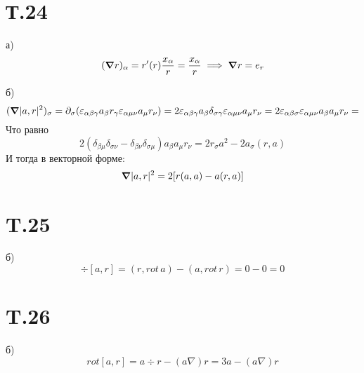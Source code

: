 \documentclass[12pt]{article}
\begin{document}
\section{Т.24}
а) 
\[
    (\grad r)_\alpha = r^{\prime}(r) \frac{x_\alpha}{r} = \frac{x_\alpha}{r} \implies 
    \grad r = e_r
\]

б) 
\[
    (\grad \vert a, r \vert^2)_\sigma = 
    \partial_\sigma (\varepsilon_{\alpha \beta \gamma} a_\beta r_\gamma \varepsilon_{\alpha \mu \nu} a_\mu r_\nu) = 
    2\varepsilon_{\alpha \beta \gamma} a_\beta \delta_{\sigma \gamma} \varepsilon_{\alpha \mu \nu} a_\mu r_\nu = 
    2 \varepsilon_{\alpha \beta \sigma} \varepsilon_{\alpha \mu \nu} a_\beta a_\mu r_\nu = 
\]
Что равно 
\[
    2(\delta_{\beta \mu} \delta_{\sigma \nu} - \delta_{\beta \nu} \delta_{\sigma \mu}) a_\beta a_\mu r_\nu = 
    2 r_\sigma a^2 - 2a_\sigma (r, a)
\]
И тогда в векторной форме: 
\[
    \grad \vert a, r \vert^2 = 2 [r (a, a) - a (r, a)]
\]

\section{T.25}
б) 
\[
    \div [a, r] = (r, rot \, a) - (a, rot \, r) = 
    0 - 0 = 0
\]

\section{T.26}
б)
\[
    rot [a, r] = a \div r - (a \nabla) r = 
    3a - (a \nabla) r
\]
\end{document}
